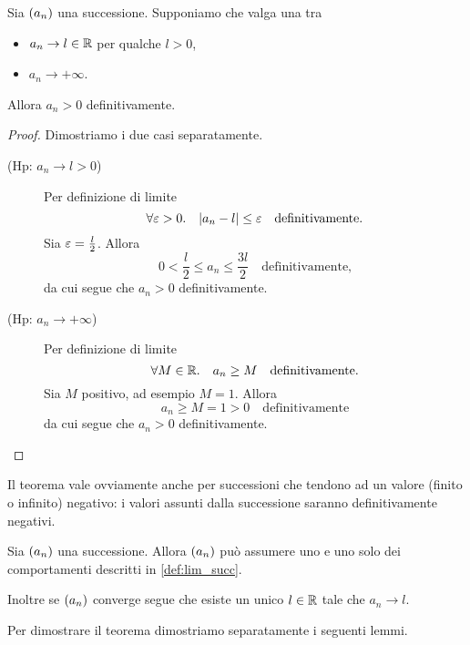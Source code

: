 \begin{theorem}
     \label{th:perm_segno_succ}
    Sia $\seqn*{a}$ una successione. Supponiamo che valga una tra \begin{itemize}
        \item $a_n \to l \in \mathbb{R}$ per qualche $l > 0$,
        \item $a_n \to +\infty$.
    \end{itemize}

    Allora $a_n > 0$ definitivamente.
\end{theorem}
\begin{proof}
    Dimostriamo i due casi separatamente.
    \begin{description}
        \item[(Hp: $a_n \to l > 0$)]  Per definizione di limite \[
            \forall \eps > 0. \quad \abs*{a_n - l} \leq \eps \quad \text{definitivamente.}
        \]
        Sia $\varepsilon = \frac{l}{2}$. Allora \[
            0 < \frac{l}{2} \leq a_n \leq \frac{3l}{2} \quad \text{definitivamente,}
        \] da cui segue che $a_n > 0$ definitivamente.
        \item[(Hp: $a_n \to +\infty$)] Per definizione di limite \[
            \forall M \in \mathbb{R}. \quad a_n \geq M \quad \text{definitivamente.}
        \]
        Sia $M$ positivo, ad esempio $M = 1$. Allora \[
            a_n \geq M = 1 > 0 \quad \text{definitivamente}
        \] da cui segue che $a_n > 0$ definitivamente.\qedhere
    \end{description}  
\end{proof}

Il teorema vale ovviamente anche per successioni che tendono ad un valore (finito o infinito) negativo: i valori assunti dalla successione saranno definitivamente negativi.

\begin{theorem}
     \label{th:unic_lim_succ}
    Sia $\seqn*{a}$ una successione. Allora $\seqn*{a}$ può assumere uno e uno solo dei comportamenti descritti in \ref{def:lim_succ}.

    Inoltre se $\seqn*{a}$ converge segue che esiste un unico $l \in \mathbb{R}$ tale che $a_n \to l$.
\end{theorem}

Per dimostrare il teorema dimostriamo separatamente i seguenti lemmi.

